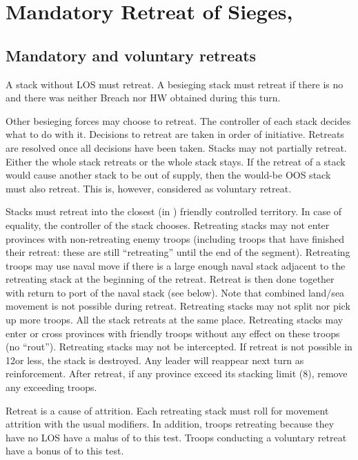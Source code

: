 \section{Mandatory Retreat of Sieges, \Presidios}\label{chRedep:Retreat, presidios}

\subsection{Mandatory and voluntary retreats}
\bparag A stack without LOS must retreat.
\bparag A besieging stack must retreat if there is no \USURE\Faceplus and
there was neither Breach nor HW obtained during this turn.

\bparag Other besieging forces may choose to retreat. The controller of each
stack decides what to do with it.
\bparag Decisions to retreat are taken in order of initiative. Retreats are
resolved once all decisions have been taken.
\bparag Stacks may not partially retreat. Either the whole stack retreats or
the whole stack stays.
\bparag If the retreat of a stack would cause another stack to be out of
supply, then the would-be OOS stack must also retreat. This is, however,
considered as voluntary retreat.

\bparag Stacks must retreat into the closest (in \MP) friendly controlled
territory. In case of equality, the controller of the stack chooses.
\bparag Retreating stacks may not enter provinces with non-retreating enemy
troops (including troops that have finished their retreat: these are still
``retreating'' until the end of the segment).
\bparag Retreating troops may use naval move if there is a large enough naval
stack adjacent to the retreating stack at the beginning of the
retreat. Retreat is then done together with return to port of the naval stack
(see below). Note that combined land/sea movement is not possible during
retreat.
\bparag Retreating stacks may not split nor pick up more troops. All the stack
retreats at the same place.
\bparag Retreating stacks may enter or cross provinces with friendly troops
without any effect on these troops (no ``rout'').
\bparag Retreating stacks may not be intercepted.
\bparag If retreat is not possible in 12\MP or less, the stack is
destroyed. Any leader will reappear next turn as reinforcement.
\bparag After retreat, if any province exceed its stacking limit (8\LD),
remove any exceeding troops.

\bparag Retreat is a cause of attrition. Each retreating stack must roll for
movement attrition with the usual modifiers.
\bparag In addition, troops retreating because they have no LOS have a malus
of  to this test.
\bparag Troops conducting a voluntary retreat have a bonus of  to
this test.


